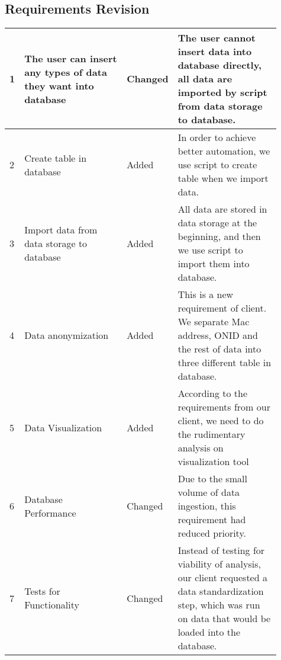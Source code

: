 \subsection{Requirements Revision}
\vspace*{+30pt}
\begin{tabular}{| p{0.01\linewidth} | p{0.4\linewidth} | p{0.1\linewidth} | p{0.40\linewidth} |}\hline
1 & The user can insert any types of data they want into database & Changed & The user cannot insert data into database directly, all data are imported by script from data storage to database.\\ 
\hline
2 & Create table in database & Added & In order to achieve better automation, we use script to create table when we import data.\\ 
\hline
3 & Import data from data storage to database & Added & All data are stored in data storage at the beginning, and then we use script to import them into database.\\ 
\hline
4 & Data anonymization & Added & This is a new requirement of client. We separate Mac address, ONID and the rest of data into three different table in database.\\ 
\hline
5 & Data Visualization & Added &  According to the requirements from our client, we need to do the rudimentary analysis on visualization tool\\ 
\hline
6 & Database Performance & Changed &  Due to the small volume of data ingestion, this requirement had reduced priority.\\ 
\hline
7 & Tests for Functionality & Changed &  Instead of testing for viability of analysis, our client requested a data standardization step, which was run on data that would be loaded into the database.\\ 
\hline
\end{tabular}
